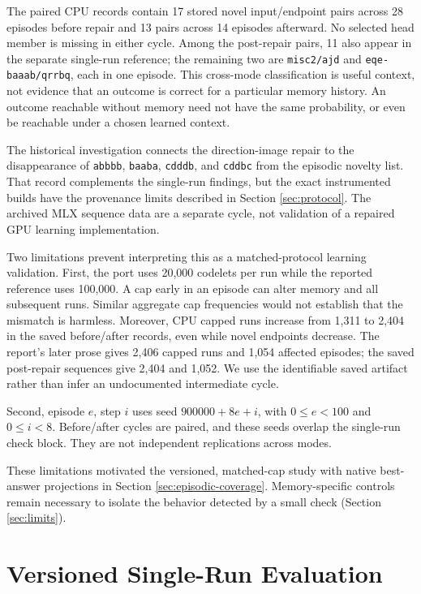 \documentclass[10pt,letterpaper]{article}
\begin{document}


The paired CPU records contain 17 stored novel input/endpoint pairs across 28 episodes
before repair and 13 pairs across 14 episodes afterward. No selected head member is
missing in either cycle. Among the post-repair pairs, 11 also appear in the separate
single-run reference; the remaining two are \texttt{misc2/ajd} and
\texttt{eqe-baaab/qrrbq}, each in one episode. This cross-mode classification is useful
context, not evidence that an outcome is correct for a particular memory history. An
outcome reachable without memory need not have the same probability, or even be reachable
under a chosen learned context.

The historical investigation connects the direction-image repair to the disappearance of
\texttt{abbbb}, \texttt{baaba}, \texttt{cdddb}, and \texttt{cddbc} from the episodic
novelty list. That record complements the single-run findings, but the exact instrumented
builds have the provenance limits described in Section \ref{sec:protocol}. The archived
MLX sequence data are a separate cycle, not validation of a repaired GPU learning
implementation.

Two limitations prevent interpreting this as a matched-protocol learning validation.
First, the port uses 20,000 codelets per run while the reported reference uses 100,000. A
cap early in an episode can alter memory and all subsequent runs. Similar aggregate cap
frequencies would not establish that the mismatch is harmless. Moreover, CPU capped runs
increase from 1,311 to 2,404 in the saved before/after records, even while novel endpoints
decrease. The report's later prose gives 2,406 capped runs and 1,054 affected episodes;
the saved post-repair sequences give 2,404 and 1,052. We use the identifiable saved
artifact rather than infer an undocumented intermediate cycle.

Second, episode \(e\), step \(i\) uses seed \(900000+8e+i\), with \(0\le e<100\) and
\(0\le i<8\). Before/after cycles are paired, and these seeds overlap the single-run check
block. They are not independent replications across modes.

These limitations motivated the versioned, matched-cap study with native best-answer
projections in Section \ref{sec:episodic-coverage}. Memory-specific controls remain
necessary to isolate the behavior detected by a small check (Section \ref{sec:limits}).

\section{Versioned Single-Run Evaluation}\label{sec:single-study}
\end{document}

